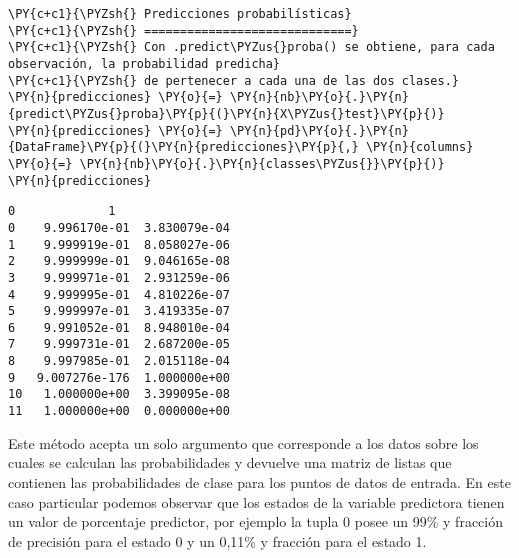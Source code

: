     \begin{tcolorbox}[breakable, size=fbox, boxrule=1pt, pad at break*=1mm,colback=cellbackground, colframe=cellborder]
\begin{Verbatim}[commandchars=\\\{\}]
\PY{c+c1}{\PYZsh{} Predicciones probabilísticas}
\PY{c+c1}{\PYZsh{} =============================}
\PY{c+c1}{\PYZsh{} Con .predict\PYZus{}proba() se obtiene, para cada observación, la probabilidad predicha}
\PY{c+c1}{\PYZsh{} de pertenecer a cada una de las dos clases.}
\PY{n}{predicciones} \PY{o}{=} \PY{n}{nb}\PY{o}{.}\PY{n}{predict\PYZus{}proba}\PY{p}{(}\PY{n}{X\PYZus{}test}\PY{p}{)}
\PY{n}{predicciones} \PY{o}{=} \PY{n}{pd}\PY{o}{.}\PY{n}{DataFrame}\PY{p}{(}\PY{n}{predicciones}\PY{p}{,} \PY{n}{columns} \PY{o}{=} \PY{n}{nb}\PY{o}{.}\PY{n}{classes\PYZus{}}\PY{p}{)}
\PY{n}{predicciones}
\end{Verbatim}
\end{tcolorbox}

            \begin{tcolorbox}[breakable, size=fbox, boxrule=.5pt, pad at break*=1mm, opacityfill=0]
\begin{Verbatim}[commandchars=\\\{\}]
                0             1
0    9.996170e-01  3.830079e-04
1    9.999919e-01  8.058027e-06
2    9.999999e-01  9.046165e-08
3    9.999971e-01  2.931259e-06
4    9.999995e-01  4.810226e-07
5    9.999997e-01  3.419335e-07
6    9.991052e-01  8.948010e-04
7    9.999731e-01  2.687200e-05
8    9.997985e-01  2.015118e-04
9   9.007276e-176  1.000000e+00
10   1.000000e+00  3.399095e-08
11   1.000000e+00  0.000000e+00
\end{Verbatim}
\end{tcolorbox}
        
    Este método acepta un solo argumento que corresponde a los datos sobre
los cuales se calculan las probabilidades y devuelve una matriz de
listas que contienen las probabilidades de clase para los puntos de
datos de entrada. En este caso particular podemos observar que los
estados de la variable predictora tienen un valor de porcentaje
predictor, por ejemplo la tupla 0 posee un 99\% y fracción de precisión
para el estado 0 y un 0,11\% y fracción para el estado 1.

